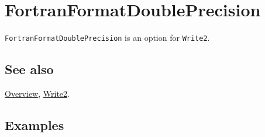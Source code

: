 \documentclass[../FeynCalcManual.tex]{subfiles}
\begin{document}
\hypertarget{fortranformatdoubleprecision}{
\section{FortranFormatDoublePrecision}\label{fortranformatdoubleprecision}}

\texttt{FortranFormatDoublePrecision} is an option for \texttt{Write2}.

\subsection{See also}

\hyperlink{toc}{Overview}, \hyperlink{write2}{Write2}.

\subsection{Examples}
\end{document}
